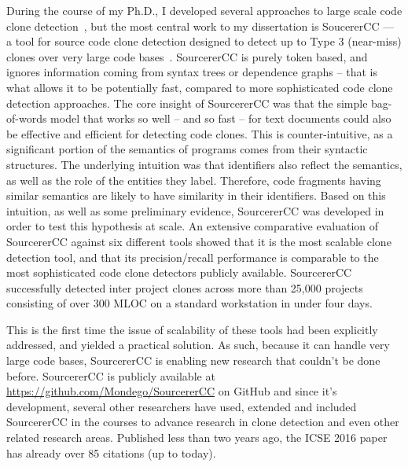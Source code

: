 \documentclass[a4paper]{article}
\begin{document}
During the course of my Ph.D., I developed several approaches to large scale code clone detection~\cite{parallellCCW, parallellCCJ, parallellCCC}, but the most central work to my dissertation is SoucererCC  ---  a tool for source code clone detection designed to detect up to Type 3 (near-miss) clones over very large code bases~\cite{sourcererCC}.  SourcererCC is purely token based, and ignores information coming from syntax trees or dependence graphs – that is what allows it to be potentially fast, compared to more sophisticated code clone detection approaches. %
The core insight of SourcererCC was that the simple bag-of-words model that works so well – and so fast – for text documents could also be effective and efficient for detecting code clones. This is counter-intuitive, as a significant portion of the semantics of programs comes from their syntactic structures. The underlying intuition was that identifiers also reflect the semantics, as well as the role of the entities they label. Therefore, code fragments having similar semantics are likely to have similarity in their identifiers. Based on this intuition, as well as some preliminary evidence, SourcererCC was developed in order to test this hypothesis at scale. An extensive comparative evaluation of SourcererCC against six different tools showed that it is the most scalable clone detection tool, and that its precision/recall performance is comparable to the most sophisticated code clone detectors publicly available. SourcererCC successfully detected inter project clones across more than 25,000 projects consisting of over 300 MLOC on a standard workstation in under four days.

This is the first time the issue of scalability of these tools had been explicitly addressed, and yielded a practical solution.  As such, because it can handle very large code bases, SourcererCC is enabling new research that couldn’t be done before. SourcererCC is publicly available at \url{https://github.com/Mondego/SourcererCC} on GitHub and since it's development, several other researchers have used, extended and included  SourcererCC in the courses to advance research in clone detection and even other related research areas. Published less than two years ago, the ICSE 2016 paper has already over 85 citations (up to today). 
\end{document}
